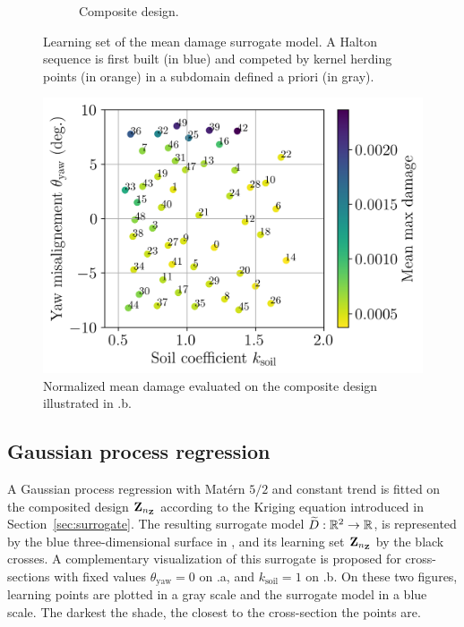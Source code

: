 \begin{figure}
\begin{subfigure}{0.48\linewidth}
        \caption{Composite design.}
    \end{subfigure}
    \caption{Learning set of the mean damage surrogate model. A Halton sequence is first built (in blue) and competed by kernel herding points (in orange) in a subdomain defined a priori (in gray).}
    \label{fig:initial_doe}
\end{figure}

\begin{figure}[h!]
    \centering
    \includegraphics[width=0.6\linewidth]{./part3/figures/OWT/normalized_results_mean.png}
    \caption{Normalized mean damage evaluated on the composite design illustrated in .b.}
    \label{fig:evaluated_doe}
\end{figure}


\subsection{Gaussian process regression}

A Gaussian process regression with Matérn $5/2$ and constant trend is fitted on the composited design ${\bf Z}_{n_{\bf Z}}$ according to the Kriging equation introduced in Section~\ref{sec:surrogate}. 
The resulting surrogate model $\widetilde{D}:\mathbb{R}^2 \rightarrow \mathbb{R}$, is represented by the blue three-dimensional surface in , and its learning set  ${\bf Z}_{n_{\bf Z}}$ by the black crosses.  
A complementary visualization of this surrogate is proposed for cross-sections with fixed values $\theta_{\mathrm{yaw}}=0$ on .a, and $k_{\mathrm{soil}}=1$ on .b. 
On these two figures, learning points are plotted in a gray scale and the surrogate model in a blue scale. 
The darkest the shade, the closest to the cross-section the points are. 

